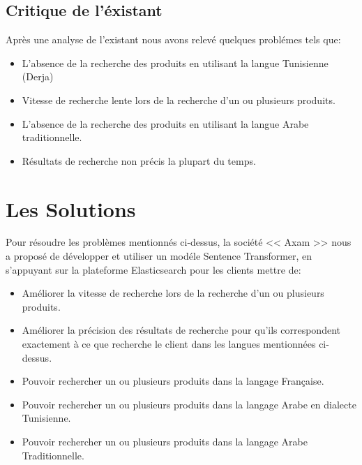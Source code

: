 \subsection{Critique de l'éxistant}
\noindent
Après une analyse de l'existant nous avons relevé quelques problémes tels que:

\renewcommand\labelitemi{$\bullet$}
\begin{itemize}
    \item L'absence de la recherche des produits en utilisant la langue Tunisienne (Derja) 
    \item Vitesse de recherche lente lors de la recherche d'un ou plusieurs produits.
    \item L'absence de la recherche des produits en utilisant la langue Arabe traditionnelle.
    \item Résultats de recherche non précis la plupart du temps.
\end{itemize}

\newpage
\section{Les Solutions}
\noindent
Pour résoudre les problèmes mentionnés ci-dessus, la société << Axam >> nous a proposé de développer et utiliser un modéle Sentence Transformer, en s'appuyant sur la plateforme Elasticsearch pour les clients mettre de:

\renewcommand\labelitemi{$\bullet$}
\begin{itemize}
    \item Améliorer la vitesse de recherche lors de la recherche d’un ou plusieurs produits.

    \item Améliorer la précision des résultats de recherche pour qu'ils correspondent exactement à ce que recherche le client dans les langues mentionnées ci-dessus.

    \item Pouvoir rechercher un ou plusieurs produits dans la langage Française.

    \item Pouvoir rechercher un ou plusieurs produits dans la langage Arabe en dialecte Tunisienne.

    \item Pouvoir rechercher un ou plusieurs produits dans la langage Arabe Traditionnelle.
\end{itemize}